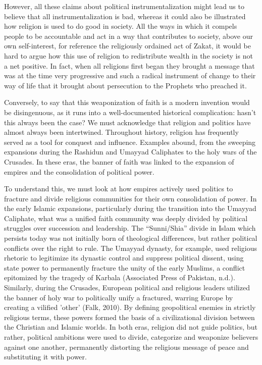 \documentclass[12pt]{article}
\begin{document}
However, all these claims about political instrumentalization might lead us to believe that all instrumentalization is bad, whereas it could also be illustrated how religion is used to do good in society. All the ways in which it compels people to be accountable and act in a way that contributes to society, above our own self-interest, for reference the religiously ordained act of Zakat, it would be hard to argue how this use of religion to redistribute wealth in the society is not a net positive. In fact, when all religions first began they brought a message that was at the time very progressive and such a radical instrument of change to their way of life that it brought about persecution to the Prophets who preached it.

Conversely, to say that this weaponization of faith is a modern invention would be disingenuous, as it runs into a well-documented historical complication: hasn't this always been the case? We must acknowledge that religion and politics have almost always been intertwined. Throughout history, religion has frequently served as a tool for conquest and influence. Examples abound, from the sweeping expansions during the Rashidun and Umayyad Caliphates to the holy wars of the Crusades. In these eras, the banner of faith was linked to the expansion of empires and the consolidation of political power.

\vspace{2em}

To understand this, we must look at how empires actively used politics to fracture and divide religious communities for their own consolidation of power. In the early Islamic expansions, particularly during the transition into the Umayyad Caliphate, what was a unified faith community was deeply divided by political struggles over succession and leadership. The “Sunni/Shia” divide in Islam which persists today was not initially born of theological differences, but rather political conflicts over the right to rule. The Umayyad dynasty, for example, used religious rhetoric to legitimize its dynastic control and suppress political dissent, using state power to permanently fracture the unity of the early Muslims, a conflict epitomized by the tragedy of Karbala (Associated Press of Pakistan, n.d.). Similarly, during the Crusades, European political and religious leaders utilized the banner of holy war to politically unify a fractured, warring Europe by creating a vilified 'other' (Falk, 2010). By defining geopolitical enemies in strictly religious terms, these powers formed the basis of a civilizational division between the Christian and Islamic worlds. In both eras, religion did not guide politics, but rather, political ambitions were used to divide, categorize and weaponize believers against one another, permanently distorting the religious message of peace and substituting it with power.
\end{document}
